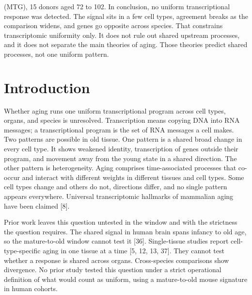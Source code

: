\documentclass[11pt]{article}
\begin{document}
(MTG), 15 donors aged 72 to 102. In conclusion, no uniform transcriptional response was detected. The signal sits in a few cell types, agreement breaks as the comparison widens, and genes go opposite across species. That constrains transcriptomic uniformity only. It does not rule out shared upstream processes, and it does not separate the main theories of aging. Those theories predict shared processes, not one uniform pattern.

\section*{Introduction}

Whether aging runs one uniform transcriptional program across cell types, organs, and species is unresolved. Transcription means copying DNA into RNA messages; a transcriptional program is the set of RNA messages a cell makes. Two patterns are possible in old tissue. One pattern is a shared broad change in every cell type. It shows weakened identity, transcription of genes outside their program, and movement away from the young state in a shared direction. The other pattern is heterogeneity. Aging comprises time-associated processes that co-occur and interact with different weights in different tissues and cell types. Some cell types change and others do not, directions differ, and no single pattern appears everywhere. Universal transcriptomic hallmarks of mammalian aging have been claimed [8].

Prior work leaves this question untested in the window and with the strictness the question requires. The shared signal in human brain spans infancy to old age, so the mature-to-old window cannot test it [36]. Single-tissue studies report cell-type-specific aging in one tissue at a time [5, 12, 13, 37]. They cannot test whether a response is shared across organs. Cross-species comparisons show divergence. No prior study tested this question under a strict operational definition of what would count as uniform, using a mature-to-old mouse signature in human cohorts.
\end{document}
